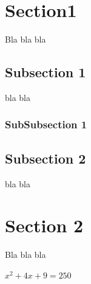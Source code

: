 \documentclass{article}
\begin{document}
\pagebreak


\pagebreak

\section{Section1}
Bla bla bla 
\subsection{Subsection 1}
bla bla
\subsubsection{SubSubsection 1}

\subsection{Subsection 2}
bla bla

\section{Section 2}
Bla bla bla \cite{CountdownTimer}



$ x^2 + 4x + 9 = 250 $





\end{document}
